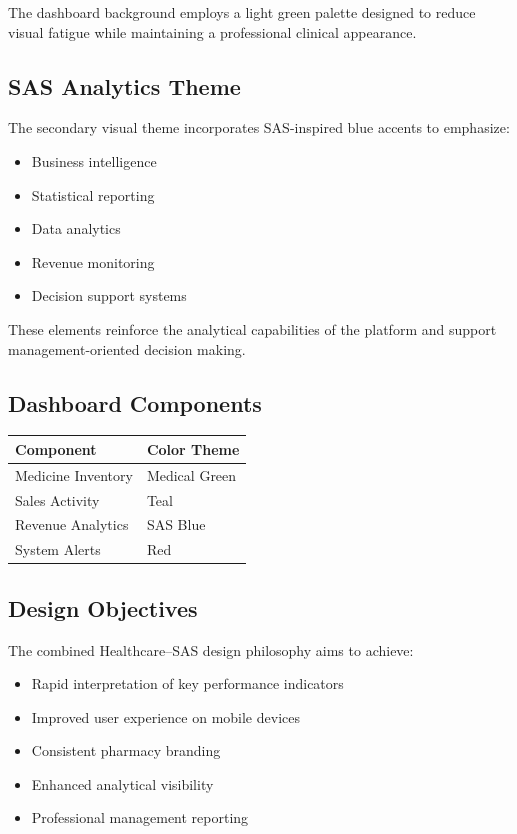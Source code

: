 \documentclass[12pt,a4paper]{article}
\begin{document}
The dashboard background employs a light green palette designed to reduce visual fatigue while maintaining a professional clinical appearance.

\subsection*{SAS Analytics Theme}

The secondary visual theme incorporates SAS-inspired blue accents to emphasize:

\begin{itemize}
\item Business intelligence
\item Statistical reporting
\item Data analytics
\item Revenue monitoring
\item Decision support systems
\end{itemize}

These elements reinforce the analytical capabilities of the platform and support management-oriented decision making.

\subsection*{Dashboard Components}

\begin{longtable}{ll}
\toprule
Component & Color Theme \\
\midrule
Medicine Inventory & Medical Green \\
Sales Activity & Teal \\
Revenue Analytics & SAS Blue \\
System Alerts & Red \\
\bottomrule
\end{longtable}

\subsection*{Design Objectives}

The combined Healthcare--SAS design philosophy aims to achieve:

\begin{itemize}
\item Rapid interpretation of key performance indicators
\item Improved user experience on mobile devices
\item Consistent pharmacy branding
\item Enhanced analytical visibility
\item Professional management reporting
\end{itemize}
\end{document}
